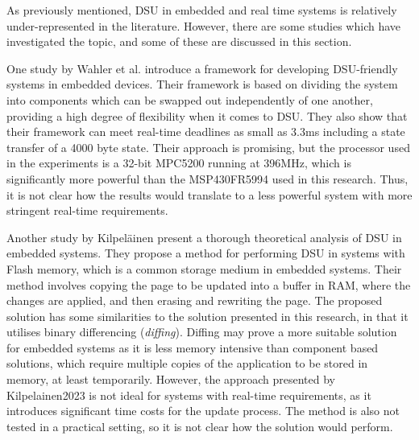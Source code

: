 As previously mentioned, DSU in embedded and real time systems is relatively under-represented in the literature. However, there are some studies which have investigated the topic, and some of these are discussed in this section.

One study by Wahler et al. \cite{dynUpdateFramework} introduce a framework for developing DSU-friendly systems in embedded devices. Their framework is based on dividing the system into components which can be swapped out independently of one another, providing a high degree of flexibility when it comes to DSU. They also show that their framework can meet real-time deadlines as small as 3.3ms including a state transfer of a  4000 byte state.  Their approach is promising, but the processor used in the experiments is a 32-bit MPC5200 running at 396MHz, which is significantly more powerful than the MSP430FR5994 used in this research. Thus, it is not clear how the results would translate to a less powerful system with more stringent real-time requirements.

Another study by Kilpeläinen \cite{Kilpelainen2023} present a thorough theoretical analysis of DSU in embedded systems. They propose a method for performing DSU in systems with Flash memory, which is a common storage medium in embedded systems. Their method involves copying the page to be updated into a buffer in RAM, where the changes are applied, and then erasing and rewriting the page. The proposed solution has some similarities to the solution presented in this research, in that it utilises binary differencing (\textit{diffing}). Diffing may prove a more suitable solution for embedded systems as it is less memory intensive than component based solutions, which require multiple copies of the application to be stored in memory, at least temporarily. However, the approach presented by Kilpelainen2023 is not ideal for systems with real-time requirements, as it introduces significant time costs for the update process. The method is also not tested in a practical setting, so it is not clear how the solution would perform. 

